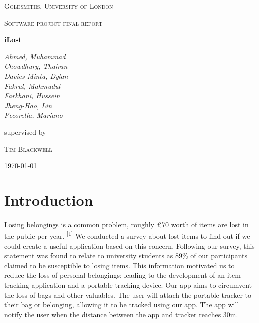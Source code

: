 \documentclass[12pt,a4paper]{article}
\begin{document}
    \begin{titlepage}
      \centering
      {\scshape\LARGE Goldsmiths, University of London \par}
      \vspace{1cm}
      {\scshape\Large Software project final report\par}
      \vspace{1.5cm}
      {\huge\bfseries iLost\par}
      \vspace{2cm}
      {\Large\itshape 
        Ahmed, Muhammad\\
        Chowdhury, Thairan\\
        Davies Minta, Dylan\\     
        Fakrul, Mahmudul\\    
        Farkhani, Hussein\\ 
        Jheng-Hao, Lin\\
        Pecorella, Mariano\\ \par}
      \vfill
      supervised by\par
      \textsc{Tim Blackwell} 
      \vfill
      {\large \today \par}
    \end{titlepage}
    \tableofcontents
    \newpage
    \section{Introduction}
      \paragraph{} Losing belongings is a common problem, roughly £70 worth of items are lost in the public per year. \textsuperscript{[1]} We conducted a survey about lost items to find out if we could create a useful application based on this concern. Following our survey, this statement was found to relate to university students as 89\% of our participants claimed to be susceptible to losing items. This information motivated us to reduce the loss of personal belongings; leading to the development of an item tracking application and a portable tracking device. Our app aims to circumvent the loss of bags and other valuables. The user will attach the portable tracker to their bag or belonging, allowing it to be tracked using our app. The app will notify the user when the distance between the app and tracker reaches 30m.
      
\end{document}

